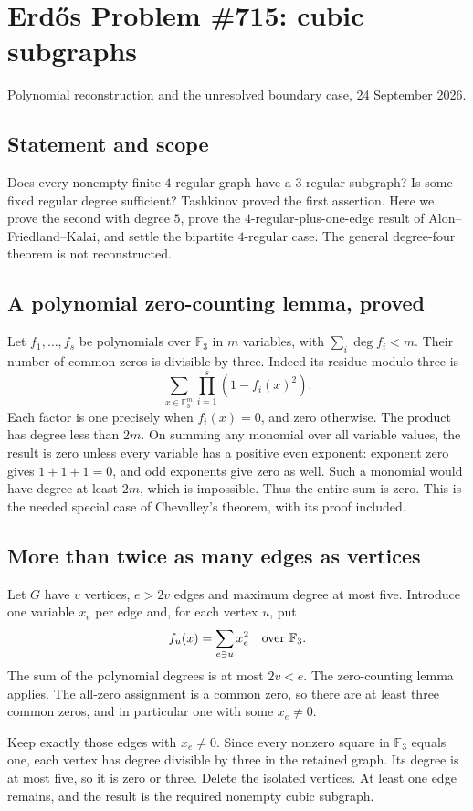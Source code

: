 \section{Erd\H{o}s Problem \#715: cubic subgraphs}
\noindent Polynomial reconstruction and the unresolved boundary case, 24 September 2026.

\subsection*{Statement and scope}
Does every nonempty finite $4$-regular graph have a $3$-regular subgraph? Is some fixed regular degree sufficient? Tashkinov proved the first assertion. Here we prove the second with degree $5$, prove the $4$-regular-plus-one-edge result of Alon--Friedland--Kalai, and settle the bipartite $4$-regular case. The general degree-four theorem is not reconstructed.

\subsection*{A polynomial zero-counting lemma, proved}
Let $f_1,\ldots,f_s$ be polynomials over $\mathbb F_3$ in $m$ variables, with $\sum_i\deg f_i<m$. Their number of common zeros is divisible by three. Indeed its residue modulo three is
\[
 \sum_{x\in\mathbb F_3^m}\prod_{i=1}^s(1-f_i(x)^2).
\]
Each factor is one precisely when $f_i(x)=0$, and zero otherwise. The product has degree less than $2m$. On summing any monomial over all variable values, the result is zero unless every variable has a positive even exponent: exponent zero gives $1+1+1=0$, and odd exponents give zero as well. Such a monomial would have degree at least $2m$, which is impossible. Thus the entire sum is zero. This is the needed special case of Chevalley's theorem, with its proof included.

\subsection*{More than twice as many edges as vertices}
Let $G$ have $v$ vertices, $e>2v$ edges and maximum degree at most five. Introduce one variable $x_e$ per edge and, for each vertex $u$, put
\[
 f_u(x)=\sum_{e\ni u}x_e^2\quad\hbox{over }\mathbb F_3.
\]
The sum of the polynomial degrees is at most $2v<e$. The zero-counting lemma applies. The all-zero assignment is a common zero, so there are at least three common zeros, and in particular one with some $x_e\ne0$.

Keep exactly those edges with $x_e\ne0$. Since every nonzero square in $\mathbb F_3$ equals one, each vertex has degree divisible by three in the retained graph. Its degree is at most five, so it is zero or three. Delete the isolated vertices. At least one edge remains, and the result is the required nonempty cubic subgraph.


